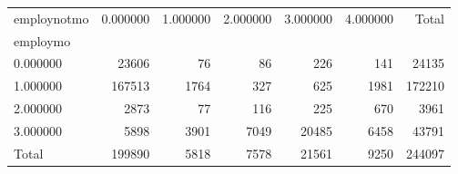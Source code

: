 \begin{tabular}{lrrrrrr}
\toprule
employnotmo & 0.000000 & 1.000000 & 2.000000 & 3.000000 & 4.000000 & Total \\
employmo &  &  &  &  &  &  \\
\midrule
0.000000 & 23606 & 76 & 86 & 226 & 141 & 24135 \\
1.000000 & 167513 & 1764 & 327 & 625 & 1981 & 172210 \\
2.000000 & 2873 & 77 & 116 & 225 & 670 & 3961 \\
3.000000 & 5898 & 3901 & 7049 & 20485 & 6458 & 43791 \\
Total & 199890 & 5818 & 7578 & 21561 & 9250 & 244097 \\
\bottomrule
\end{tabular}
